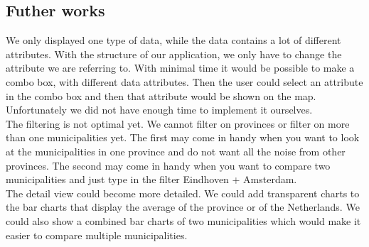 \subsection{Futher works}
We only displayed one type of data, while the data contains a lot of different attributes. With the structure of our application, we only have to change the attribute we are referring to. With minimal time it would be possible to make a combo box, with different data attributes. Then the user could select an attribute in the combo box and then that attribute would be shown on the map. Unfortunately we did not have enough time to implement it ourselves.  \\
The filtering is not optimal yet. We cannot filter on provinces or filter on more than one municipalities yet. The first may come in handy when you want to look at the municipalities in one province and do not want all the noise from other provinces. The second may come in handy when you want to compare two municipalities and just type in the filter Eindhoven + Amsterdam. \\
The detail view could become more detailed. We could add  transparent charts to the bar charts that display the average of the province or of the Netherlands. We could also show a combined bar charts of two municipalities which would make it easier to compare multiple municipalities.  \\